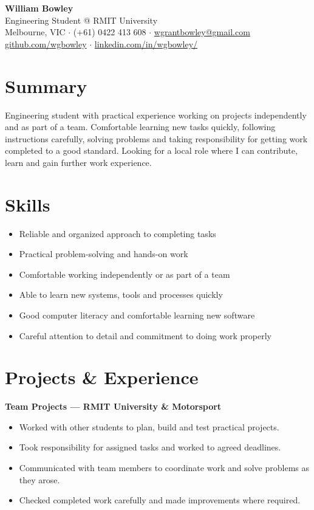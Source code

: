 \documentclass[11pt,a4paper]{article}
\begin{document}
\begin{center}
{\LARGE \textbf{William Bowley}} \\[4pt]
{\large Engineering Student @ RMIT University} \\[2pt]
Melbourne, VIC \quad $\cdot$ \quad (+61) 0422 413 608 \quad $\cdot$ \quad \href{mailto:wgrantbowley@gmail.com}{wgrantbowley@gmail.com} \\[2pt]
\href{https://github.com/wgbowley}{github.com/wgbowley} \quad $\cdot$ \quad
\href{https://linkedin.com/in/wgbowley}{linkedin.com/in/wgbowley/}
\end{center}

\section*{Summary}
\noindent Engineering student with practical experience working on projects 
independently and as part of a team. Comfortable learning new tasks quickly,
following instructions carefully, solving problems and taking responsibility 
for getting work completed to a good standard. Looking for a local role where 
I can contribute, learn and gain further work experience.

\section*{Skills}
\begin{itemize}[leftmargin=*, noitemsep, topsep=0pt]
\item Reliable and organized approach to completing tasks
\item Practical problem-solving and hands-on work
\item Comfortable working independently or as part of a team
\item Able to learn new systems, tools and processes quickly
\item Good computer literacy and comfortable learning new software
\item Careful attention to detail and commitment to doing work properly
\end{itemize}

\section*{Projects \& Experience}

\noindent\textbf{Team Projects --- RMIT University \& Motorsport}
\begin{itemize}[leftmargin=*, noitemsep, topsep=2pt]
\item Worked with other students to plan, build and test practical projects.
\item Took responsibility for assigned tasks and worked to agreed deadlines.
\item Communicated with team members to coordinate work and solve problems as they arose.
\item Checked completed work carefully and made improvements where required.
\end{itemize}
\end{document}
